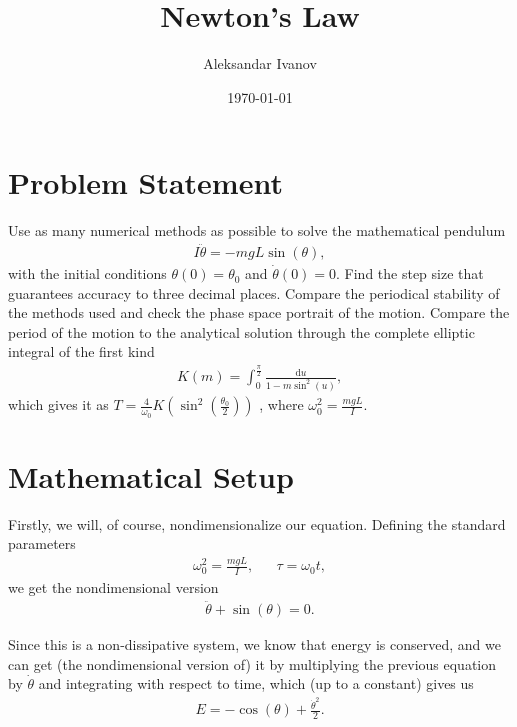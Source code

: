 \documentclass[10pt,a4paper,twocolumn]{article}
\begin{document}
\title{Newton's Law}
\author{Aleksandar Ivanov}
\date{\today}
\maketitle

\section{Problem Statement}

Use as many numerical methods as possible to solve the mathematical pendulum
%
\begin{align}
    I \ddot{\theta} = -mgL \sin(\theta),
\end{align}
%
with the initial conditions $\theta (0) = \theta_0$ and $\dot{\theta} (0) = 0$. Find the step size that guarantees accuracy to three decimal places. Compare the periodical stability of the methods used and check the phase space portrait of the motion. Compare the period of the motion to the analytical solution through the complete elliptic integral of the first kind
%
\begin{align}
    K (m) = \int_{0}^{\frac{\pi}{2}} \frac{\mathrm{d}u}{1-m \sin^2(u)},
\end{align}
%
which gives it as $T = \frac{4}{\omega_0} K \left( \sin^2 \left( \frac{\theta_0}{2} \right) \right)$ \cite{anal_per}, where $\omega_0^2 = \frac{mgL}{I} $.


\section{Mathematical Setup}

Firstly, we will, of course, nondimensionalize our equation. Defining the standard parameters
%
\begin{align}
    &\omega_0^2 = \frac{mgL}{I},& &\tau = \omega_0 t,&
\end{align}
%
we get the nondimensional version
%
\begin{align}\label{eq:diff}
    \ddot{\theta} + \sin(\theta) = 0.
\end{align}

Since this is a non-dissipative system, we know that energy is conserved, and we can get (the nondimensional version of) it by multiplying the previous equation by $\dot{\theta}$ and integrating with respect to time, which (up to a constant) gives us
%
\begin{align}\label{eq:erg}
    E = - \cos(\theta) + \frac{\dot{\theta}^2}{2}.
\end{align}
\end{document}
